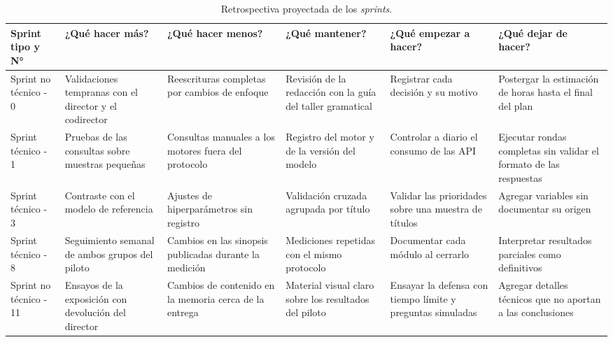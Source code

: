 \documentclass[
11pt, %
codirector, %
]{charter}
\begin{document}
\begin{table}[htpb]
\centering
\caption{Retrospectiva proyectada de los \textit{sprints}.}
\label{tab:retro}
\renewcommand{\arraystretch}{1.4}
\begin{tabular}{|>{\raggedright\arraybackslash}p{1.8cm}|
                >{\raggedright\arraybackslash}p{2.3cm}|
                >{\raggedright\arraybackslash}p{2.3cm}|
                >{\raggedright\arraybackslash}p{2.3cm}|
                >{\raggedright\arraybackslash}p{2.3cm}|
                >{\raggedright\arraybackslash}p{2.3cm}|}
\hline
\rowcolor[HTML]{CCCCCC}
Sprint tipo y N° & ¿Qué hacer más? & ¿Qué hacer menos? & ¿Qué mantener? & ¿Qué empezar a hacer? & ¿Qué dejar de hacer? \\
\hline
Sprint no técnico - 0 & Validaciones tempranas con el director y el codirector & Reescrituras completas por cambios de enfoque & Revisión de la redacción con la guía del taller gramatical & Registrar cada decisión y su motivo & Postergar la estimación de horas hasta el final del plan \\
\hline
Sprint técnico - 1 & Pruebas de las consultas sobre muestras pequeñas & Consultas manuales a los motores fuera del protocolo & Registro del motor y de la versión del modelo & Controlar a diario el consumo de las API & Ejecutar rondas completas sin validar el formato de las respuestas \\
\hline
Sprint técnico - 3 & Contraste con el modelo de referencia & Ajustes de hiperparámetros sin registro & Validación cruzada agrupada por título & Validar las prioridades sobre una muestra de títulos & Agregar variables sin documentar su origen \\
\hline
Sprint técnico - 8 & Seguimiento semanal de ambos grupos del piloto & Cambios en las sinopsis publicadas durante la medición & Mediciones repetidas con el mismo protocolo & Documentar cada módulo al cerrarlo & Interpretar resultados parciales como definitivos \\
\hline
Sprint no técnico - 11 & Ensayos de la exposición con devolución del director & Cambios de contenido en la memoria cerca de la entrega & Material visual claro sobre los resultados del piloto & Ensayar la defensa con tiempo límite y preguntas simuladas & Agregar detalles técnicos que no aportan a las conclusiones \\
\hline
\end{tabular}
\end{table}
\end{document}

